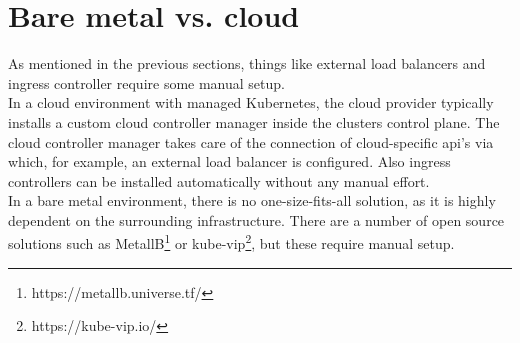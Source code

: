 \section{Bare metal vs. cloud}

As mentioned in the previous sections, things like external load balancers and ingress controller require some manual setup.
\\
In a cloud environment with managed Kubernetes, the cloud provider typically installs a custom cloud controller manager inside the clusters control plane.
The cloud controller manager takes care of the connection of cloud-specific api's via which, for example, an external load balancer is configured.
Also ingress controllers can be installed automatically without any manual effort.
\\
In a bare metal environment, there is no one-size-fits-all solution, as it is highly dependent on the surrounding infrastructure.
There are a number of open source solutions such as MetallB\footnote{https://metallb.universe.tf/} or kube-vip\footnote{https://kube-vip.io/}, but these require manual setup.
